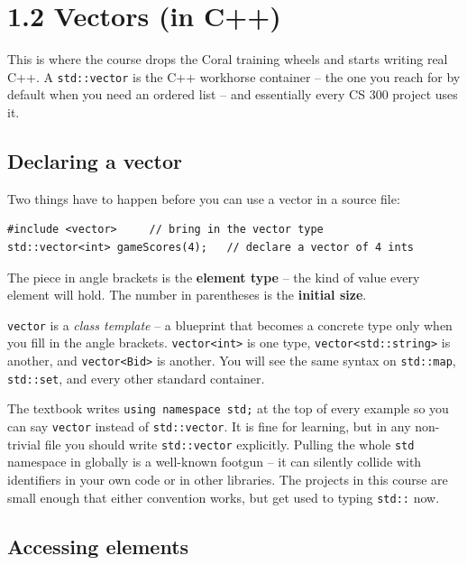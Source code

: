 \documentclass[11pt]{article}
\begin{document}
\section{1.2 Vectors (in C++)}

This is where the course drops the Coral training wheels and starts
writing real C++. A \texttt{std::vector} is the C++ workhorse container
-- the one you reach for by default when you need an ordered list --
and essentially every CS 300 project uses it.

\subsection{Declaring a vector}

Two things have to happen before you can use a vector in a source file:
\begin{lstlisting}
#include <vector>     // bring in the vector type
std::vector<int> gameScores(4);   // declare a vector of 4 ints
\end{lstlisting}

The piece in angle brackets is the \textbf{element type} -- the kind of
value every element will hold. The number in parentheses is the
\textbf{initial size}.

\begin{defnbox}
\texttt{vector} is a \emph{class template} -- a blueprint that becomes
a concrete type only when you fill in the angle brackets.
\texttt{vector<int>} is one type, \texttt{vector<std::string>} is
another, and \texttt{vector<Bid>} is another. You will see the same
syntax on \texttt{std::map}, \texttt{std::set}, and every other
standard container.
\end{defnbox}

\begin{notebox}
The textbook writes \texttt{using namespace std;} at the top of every
example so you can say \texttt{vector} instead of \texttt{std::vector}.
It is fine for learning, but in any non-trivial file you should write
\texttt{std::vector} explicitly. Pulling the whole \texttt{std}
namespace in globally is a well-known footgun -- it can silently
collide with identifiers in your own code or in other libraries. The
projects in this course are small enough that either convention works,
but get used to typing \texttt{std::} now.
\end{notebox}

\subsection{Accessing elements}
\end{document}
